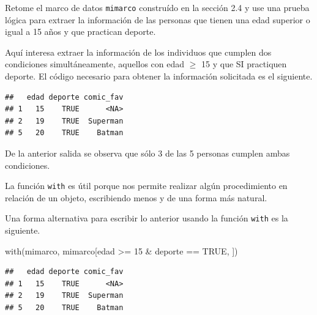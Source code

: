 \documentclass[
]{book}
\makeatletter
\newenvironment{Shaded}{\begin{snugshade}}{\end{snugshade}}
\newcommand{\ConstantTok}[1]{\textcolor[rgb]{0.00,0.00,0.00}{#1}}
\newcommand{\DecValTok}[1]{\textcolor[rgb]{0.00,0.00,0.81}{#1}}
\newcommand{\FunctionTok}[1]{\textcolor[rgb]{0.00,0.00,0.00}{#1}}
\newcommand{\NormalTok}[1]{#1}
\newcommand{\SpecialCharTok}[1]{\textcolor[rgb]{0.00,0.00,0.00}{#1}}
\newenvironment{kframe}{%
\medskip{}
\setlength{\fboxsep}{.8em}
 \def\at@end@of@kframe{}%
 \ifinner\ifhmode%
  \def\at@end@of@kframe{\end{minipage}}%
  \begin{minipage}{\columnwidth}%
 \fi\fi%
 \def\FrameCommand##1{\hskip\@totalleftmargin \hskip-\fboxsep
 \colorbox{shadecolor}{##1}\hskip-\fboxsep
     \hskip-\linewidth \hskip-\@totalleftmargin \hskip\columnwidth}%
 \MakeFramed {\advance\hsize-\width
   \@totalleftmargin\z@ \linewidth\hsize
   \@setminipage}}%
 {\par\unskip\endMakeFramed%
 \at@end@of@kframe}
\renewenvironment{Shaded}{\begin{kframe}}{\end{kframe}}
\newenvironment{rmdblock}[1]
  {
  \begin{itemize}
  \renewcommand{\labelitemi}{
    \raisebox{-.7\height}[0pt][0pt]{
      {\setkeys{Gin}{width=3em,keepaspectratio}\texttt{[image: images/\#1]}}
    }
  }
  \setlength{\fboxsep}{1em}
  \begin{kframe}
  \item
  }
  {
  \end{kframe}
  \end{itemize}
  }
\newenvironment{rmdtip}
  {\begin{rmdblock}{tip}}
  {\end{rmdblock}}
\makeatother
\begin{document}
Retome el marco de datos \texttt{mimarco} construído en la sección 2.4 y use una prueba lógica para extraer la información de las personas que tienen una edad superior o igual a 15 años y que practican deporte.

Aquí interesa extraer la información de los individuos que cumplen dos condiciones simultáneamente, aquellos con edad \(\geq\) 15 y que SI practiquen deporte. El código necesario para obtener la información solicitada es el siguiente.

\begin{Shaded}
\end{Shaded}

\begin{verbatim}
##   edad deporte comic_fav
## 1   15    TRUE      <NA>
## 2   19    TRUE  Superman
## 5   20    TRUE    Batman
\end{verbatim}

De la anterior salida se observa que sólo 3 de las 5 personas cumplen ambas condiciones.

\begin{rmdtip}
La función \texttt{with} es útil porque nos permite realizar algún procedimiento en relación de un objeto, escribiendo menos y de una forma más natural.
\end{rmdtip}

Una forma alternativa para escribir lo anterior usando la función \texttt{with} es la siguiente.

\begin{Shaded}
\begin{Highlighting}[]
\FunctionTok{with}\NormalTok{(mimarco, mimarco[edad }\SpecialCharTok{\textgreater{}=} \DecValTok{15} \SpecialCharTok{\&}\NormalTok{ deporte }\SpecialCharTok{==} \ConstantTok{TRUE}\NormalTok{, ])}
\end{Highlighting}
\end{Shaded}

\begin{verbatim}
##   edad deporte comic_fav
## 1   15    TRUE      <NA>
## 2   19    TRUE  Superman
## 5   20    TRUE    Batman
\end{verbatim}
\end{document}
